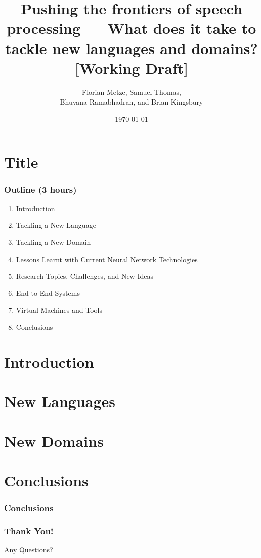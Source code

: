 \documentclass[12pt,xcolor=dvipsnames]{beamer}
\author{Florian Metze, Samuel Thomas, \\
  Bhuvana Ramabhadran, and Brian Kingsbury}
\title{{\color{Maroon} Pushing the frontiers of speech processing --- What does it take to tackle new languages and domains? [Working Draft]}}
\institute{Carnegie Mellon University and IBM}
\date{\today}
\begin{document}
\section{Title}

\begin{frame}
  \titlepage
\end{frame}



\begin{frame}
  \frametitle{Outline (3 hours)}
  \begin{enumerate}
  \item Introduction
  \item Tackling a New Language
  \item Tackling a New Domain
  \item Lessons Learnt with Current Neural Network Technologies
  \item Research Topics, Challenges, and New Ideas
  \item End-to-End Systems
  \item Virtual Machines and Tools
  \item Conclusions
  \end{enumerate}
\end{frame}

\section{Introduction}


\section{New Languages}


\section{New Domains}




\section{Conclusions}
\begin{frame}
  \frametitle{Conclusions}
\end{frame}

\begin{frame}
  \frametitle{Thank You!}
  \begin{center}
    {\color{Maroon}\Huge Any Questions?}
  \end{center}
\end{frame}
\end{document}
